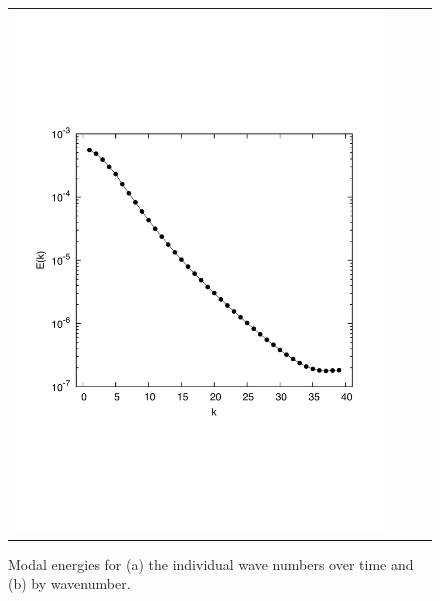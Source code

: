 \documentclass[11pt]{report}
\begin{document}
\begin{figure}
\begin{center}
\begin{tabular}{cccc}
      \includegraphics[height=0.22\textheight]{dns_modal_k}
    \end{tabular}
  \end{center}
 \caption{Modal energies for (a) the individual wave numbers over
      time and (b) by wavenumber.}
 \label{pic:modal_en}
\end{figure}
\end{document}
